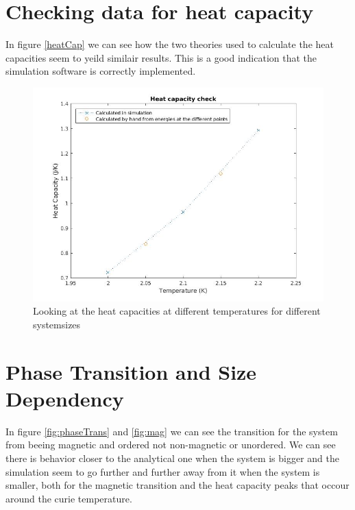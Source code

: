 \documentclass[11pt]{article}
\begin{document}
\section{Checking data for heat capacity}
In figure \ref{heatCap} we can see how the two theories used to calculate the heat capacities seem to yeild similair results. This is a good indication that the simulation software is correctly implemented.
\begin{figure}[H]
	\centering
	\includegraphics[width=1\textwidth]{../../plots/heatCap}
	\caption{Looking at the heat capacities at different temperatures for different systemsizes}
	\label{fig:heatCap}
\end{figure}

\section{Phase Transition and Size Dependency}
In figure \ref{fig:phaseTrans} and \ref{fig:mag} we can see the transition for the system from beeing magnetic and ordered not non-magnetic or unordered. We can see there is behavior closer to the analytical one when the system is bigger and the simulation seem to go further and further away from it when the system is smaller, both for the magnetic transition and the heat capacity peaks that occour around the curie temperature.
\end{document}

